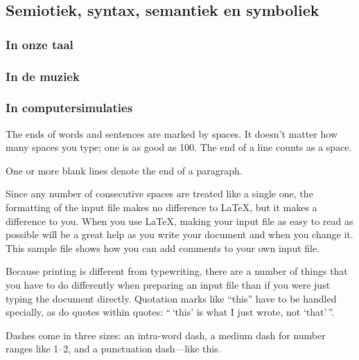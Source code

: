 \documentclass{article}      %
\begin{document}
\subsection{Semiotiek, syntax, semantiek en symboliek}

\subsubsection{In onze taal}

\subsubsection{In de muziek}

\subsubsection{In computersimulaties}

The ends  of words and sentences are marked
  by   spaces. It  doesn't matter how many
spaces    you type; one is as good as 100.  The
end of   a line counts as a space.

One   or more   blank lines denote the  end
of  a paragraph.

Since any number of consecutive spaces are treated
like a single one, the formatting of the input
file makes no difference to
      \LaTeX,                %
but it makes a difference to you.  When you use
\LaTeX, making your input file as easy to read
as possible will be a great help as you write
your document and when you change it.  This sample
file shows how you can add comments to your own input
file.

Because printing is different from typewriting,
there are a number of things that you have to do
differently when preparing an input file than if
you were just typing the document directly.
Quotation marks like
       ``this''
have to be handled specially, as do quotes within
quotes:
       ``\,`this'            %
        is what I just
        wrote, not  `that'\,''.

Dashes come in three sizes: an
       intra-word
dash, a medium dash for number ranges like
       1--2,
and a punctuation
       dash---like
this.
\end{document}
